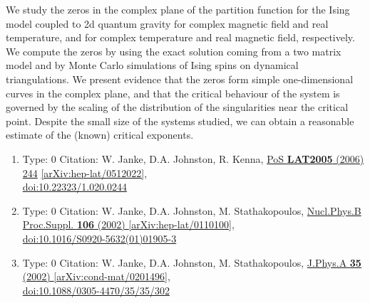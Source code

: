 \documentclass[a4paper,10pt]{article}
\begin{document}
\begin{enumerate}
We study the zeros in the complex plane of the partition function for the Ising model coupled to 2d quantum gravity for complex magnetic field and real temperature, and for complex temperature and real magnetic field, respectively. We compute the zeros by using the exact solution coming from a two matrix model and by Monte Carlo simulations of Ising spins on dynamical triangulations. We present evidence that the zeros form simple one-dimensional curves in the complex plane, and that the critical behaviour of the system is governed by the scaling of the distribution of the singularities near the critical point. Despite the small size of the systems studied, we can obtain a reasonable estimate of the (known) critical exponents.
\begin{enumerate}
  \item Type: 0 Citation: W. Janke, D.A. Johnston, R. Kenna, \href{https://www.doi.org/10.22323/1.020.0244}{PoS {\bf LAT2005} (2006) 244}  \href{https://arxiv.org/abs/hep-lat/0512022}{[arXiv:hep-lat/0512022]},\\\href{https://www.doi.org/10.22323/1.020.0244}{doi:10.22323/1.020.0244}
  \item Type: 0 Citation: W. Janke, D.A. Johnston, M. Stathakopoulos, \href{https://www.doi.org/10.1016/S0920-5632(01)01905-3}{Nucl.Phys.B Proc.Suppl. {\bf 106} (2002) }  \href{https://arxiv.org/abs/hep-lat/0110100}{[arXiv:hep-lat/0110100]},\\\href{https://www.doi.org/10.1016/S0920-5632(01)01905-3}{doi:10.1016/S0920-5632(01)01905-3}
  \item Type: 0 Citation: W. Janke, D.A. Johnston, M. Stathakopoulos, \href{https://www.doi.org/10.1088/0305-4470/35/35/302}{J.Phys.A {\bf 35} (2002) }  \href{https://arxiv.org/abs/cond-mat/0201496}{[arXiv:cond-mat/0201496]},\\\href{https://www.doi.org/10.1088/0305-4470/35/35/302}{doi:10.1088/0305-4470/35/35/302}

\end{enumerate}
\end{enumerate}
\end{document}

